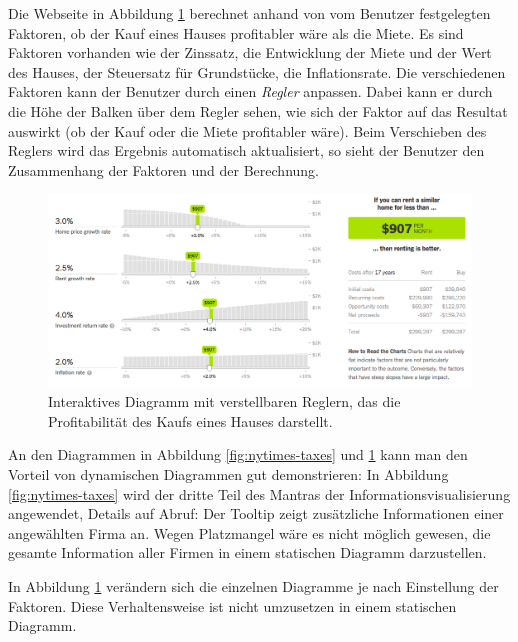 Die Webseite in Abbildung \ref{fig:nytimes-realestate} berechnet anhand von vom Benutzer festgelegten Faktoren, ob der Kauf eines Hauses profitabler wäre als die Miete. Es sind Faktoren vorhanden wie der Zinssatz, die Entwicklung der Miete und der Wert des Hauses, der Steuersatz für Grundstücke, die Inflationsrate. Die verschiedenen Faktoren kann der Benutzer durch einen \textit{Regler} anpassen. Dabei kann er durch die Höhe der Balken über dem Regler sehen, wie sich der Faktor auf das Resultat auswirkt (ob der Kauf oder die Miete profitabler wäre). Beim Verschieben des Reglers wird das Ergebnis automatisch aktualisiert, so sieht der Benutzer den Zusammenhang der Faktoren und der Berechnung.

\begin{figure}[H]
	\centering
	\includegraphics[width=\linewidth]{images/nytimes-realestate-zugeschnitten}
	\caption[Interaktives Diagramm in The New York Times ()]{Interaktives Diagramm mit verstellbaren Reglern, das die Profitabilität des Kaufs eines Hauses darstellt. \cite{nytimes-realestate}}
	\label{fig:nytimes-realestate}
\end{figure}


An den Diagrammen in Abbildung \ref{fig:nytimes-taxes} und \ref{fig:nytimes-realestate} kann man den Vorteil von dynamischen Diagrammen gut demonstrieren: In Abbildung \ref{fig:nytimes-taxes} wird der dritte Teil des Mantras der Informationsvisualisierung angewendet, Details auf Abruf: Der Tooltip zeigt zusätzliche Informationen einer angewählten Firma an. Wegen Platzmangel wäre es nicht möglich gewesen, die gesamte Information aller Firmen in einem statischen Diagramm darzustellen.

In Abbildung \ref{fig:nytimes-realestate} verändern sich die einzelnen Diagramme je nach Einstellung der Faktoren. Diese Verhaltensweise ist nicht umzusetzen in einem statischen Diagramm.

